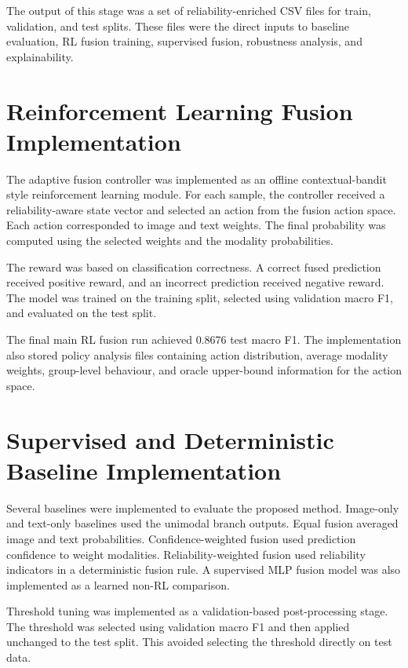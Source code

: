 The output of this stage was a set of reliability-enriched CSV files for train, validation, and test splits. These files were the direct inputs to baseline evaluation, RL fusion training, supervised fusion, robustness analysis, and explainability.


\section{Reinforcement Learning Fusion Implementation}


The adaptive fusion controller was implemented as an offline contextual-bandit style reinforcement learning module. For each sample, the controller received a reliability-aware state vector and selected an action from the fusion action space. Each action corresponded to image and text weights. The final probability was computed using the selected weights and the modality probabilities.


The reward was based on classification correctness. A correct fused prediction received positive reward, and an incorrect prediction received negative reward. The model was trained on the training split, selected using validation macro F1, and evaluated on the test split.


The final main RL fusion run achieved 0.8676 test macro F1. The implementation also stored policy analysis files containing action distribution, average modality weights, group-level behaviour, and oracle upper-bound information for the action space.


\section{Supervised and Deterministic Baseline Implementation}


Several baselines were implemented to evaluate the proposed method. Image-only and text-only baselines used the unimodal branch outputs. Equal fusion averaged image and text probabilities. Confidence-weighted fusion used prediction confidence to weight modalities. Reliability-weighted fusion used reliability indicators in a deterministic fusion rule. A supervised MLP fusion model was also implemented as a learned non-RL comparison.


Threshold tuning was implemented as a validation-based post-processing stage. The threshold was selected using validation macro F1 and then applied unchanged to the test split. This avoided selecting the threshold directly on test data.


